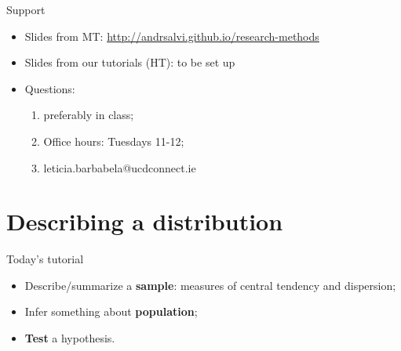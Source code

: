\documentclass[10pt]{beamer}   %
\begin{document}
\begin{frame}{Support}
\begin{itemize}
\item Slides from MT: \url{http://andrsalvi.github.io/research-methods}
\item Slides from our tutorials (HT): to be set up
\item Questions:
\begin{enumerate}
\item preferably in class;
\item Office hours: Tuesdays 11-12;
\item leticia.barbabela@ucdconnect.ie
\end{enumerate}
\end{itemize}

\end{frame}


\section{Describing a distribution}






\begin{frame}{Today's tutorial}


\begin{itemize}
\item Describe/summarize a \textbf{sample}: measures of central tendency and dispersion;
\item Infer something about \textbf{population};
\item \textbf{Test} a hypothesis.
\end{itemize}

\end{frame}



\end{document}
